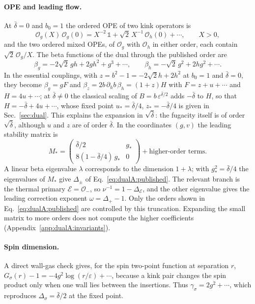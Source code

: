 \documentclass[11pt,a4paper]{article}
\numberwithin{equation}{section}
\newcommand{\De}{\Delta_{\mathcal E}}
\newcommand{\Ds}{\Delta_\sigma}
\newcommand{\db}{\bar\delta}
\newcommand{\Og}{\mathcal O_g}
\newcommand{\Oh}{\mathcal O_h}
\begin{document}
\paragraph{OPE and leading flow.} At $\db=0$ and $b_0=1$ the ordered OPE of two kink operators is
\begin{equation}
 \Og(X)\,\Og(0)=X^{-2}\,\mathbb 1+\sqrt2\,X^{-1}\,\Oh(0)+\cdots,\qquad X>0,
\end{equation}
and the two ordered mixed OPEs, of $\Og$ with $\Oh$ in either order, each contain $\sqrt2\,\Og/X$. The beta
functions of the dual through the published order are
\begin{equation}
 \beta_g=-2\sqrt2\,gh+2gh^2+g^3+\cdots,\qquad \beta_h=-\sqrt2\,g^2+2hg^2+\cdots.
 \label{eq:dualA:leadingbeta}
\end{equation}
In the essential couplings, with $z=b^2-1=-2\sqrt2h+2h^2$ at $b_0=1$ and $\db=0$, they become $\beta_g=gF$ and
$\beta_z=2b\,\partial_hb\,\beta_h=(1+z)H$ with $F=z+u+\cdots$ and $H=4u+\cdots$; at $\db\neq0$ the classical
scaling of $B=b\,\varepsilon^{\db/2}$ adds $-\db$ to $H$, so that $H=-\db+4u+\cdots$, whose fixed point $u_*=\db/4$,
$z_*=-\db/4$ is given in Sec.~\ref{sec:dual}. This explains the expansion in $\sqrt{\db}$: the fugacity itself is of
order $\sqrt{\db}$, although $u$ and $z$ are of order $\db$. In the coordinates $(g,v)$ the leading stability matrix is
\begin{equation}
 M_*=\begin{pmatrix}\db/2&g_*\\ 8(1-\db/4)\,g_*&0\end{pmatrix}+\text{higher-order terms}.
 \label{eq:dualA:Mstar}
\end{equation}
A linear beta eigenvalue $\lambda$ corresponds to the dimension $1+\lambda$; with $g_*^2=\db/4$ the eigenvalues of
$M_*$ give $\Delta_\pm$ of Eq.~\eqref{eq:dualA:published}. The relevant branch is the thermal primary
$\mathcal E=\mathcal O_-$, so $\nu^{-1}=1-\De$, and the other eigenvalue gives the leading correction exponent
$\omega=\Delta_+-1$. Only the orders shown in Eq.~\eqref{eq:dualA:published} are controlled by this truncation.
Expanding the small matrix to more orders does not compute the higher coefficients
(Appendix~\ref{app:dualA:invariants}).

\paragraph{Spin dimension.} A direct wall-gas check gives, for the spin two-point function at separation $r$,
$G_\sigma(r)-1=-4g^2\log(r/\varepsilon)+\cdots$, because a kink pair changes the spin product only when one wall lies
between the insertions. Thus $\gamma_\sigma=2g^2+\cdots$, which reproduces $\Ds=\db/2$ at the fixed point.
\end{document}
